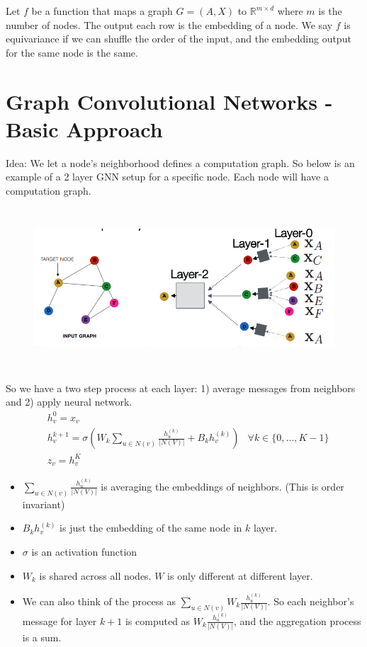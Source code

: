 Let $f$ be a function that maps a graph $G=(A,X)$ to $\mathbb{R}^{m \times d}$ where $m$ is the number of nodes. The output each row is the embedding of a node. We say $f$ is equivariance if we can shuffle the order of the input, and the embedding output for the same node is the same. 



\section{Graph Convolutional Networks - Basic Approach} 
Idea: We let a node's neighborhood defines a computation graph. So below is an example of a 2 layer GNN setup for a specific node. Each node will have a computation graph. 
    \begin{figure}[h]
    \includegraphics[width=12cm, height=6cm]{images/003_two_layer_GNN.png}
    \end{figure}

So we have a two step process at each layer: 1) average messages from neighbors and 2) apply neural network. 
    \begin{align*}
        & h_v^0 = x_v \tag{Initial 0-th layer embeddings are equal to node features} \\
        & h_v^{k+1} = \sigma(W_k \sum_{u\in N(v)} \frac{h_u^{(k)}}{|N(V)|} + B_k h_v^{(k)}) & \forall k\in \{ 0, ..., K-1\}\\
        & z_v = h_v^{K}
    \end{align*}
    \begin{itemize}
        \item $\sum_{u\in N(v)} \frac{h_u^{(k)}}{|N(V)|}$ is averaging the embeddings of neighbors. (This is order invariant)
        \item $B_k h_v^{(k)}$ is just the embedding of the same node in $k$ layer. 
        \item $\sigma$ is an activation function 
        \item $W_k$ is shared across all nodes. $W$ is only different at different layer. 
        \item We can also think of the process as $\sum_{u\in N(v)} W_k\frac{h_u^{(k)}}{|N(V)|}$. So each neighbor's message for layer $k+1$ is computed as $ W_k\frac{h_u^{(k)}}{|N(V)|}$, and the aggregation process is a sum. 
    \end{itemize}


